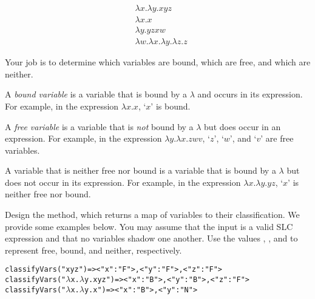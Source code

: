 
\begin{align*}
  & \lambda{}x.\lambda{y}.xyz\\
  & \lambda{x}.x\\
  & \lambda{y}.yzxw\\
  & \lambda{w}.\lambda{x}.\lambda{y}.\lambda{z}.z
\end{align*}

Your job is to determine which variables are bound, which are free, and which are neither.

A \emph{bound variable} is a variable that is bound by a $\lambda$ and occurs in its expression. For example, in the expression $\lambda{x}.x$, `$x$' is bound.

A \emph{free variable} is a variable that is \emph{not} bound by a $\lambda$ but does occur in an expression. For example, in the expression $\lambda{y}.\lambda{x}.zwv$, `$z$', `$w$', and `$v$' are free variables.

A variable that is neither free nor bound is a variable that is bound by a $\lambda$ but does not occur in its expression. For example, in the expression $\lambda{}x.\lambda{}y.yz$, `$x$' is neither free nor bound.

Design the  method, which returns a map of variables to their classification. We provide some examples below. You may assume that the input is a valid SLC expression and that no variables shadow one another. Use the values , , and  to represent free, bound, and neither, respectively.
\begin{alltt}
classifyVars("xyz")       => {<"x" : "F">, <"y" : "F">, <"z" : "F">}
classifyVars("\(\lambda\)x.\(\lambda\)y.xyz") => {<"x" : "B">, <"y" : "B">, <"z" : "F">}
classifyVars("\(\lambda\)x.\(\lambda\)y.x")   => {<"x" : "B">, <"y" : "N">}
\end{alltt}


